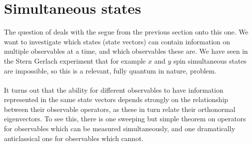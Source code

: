 \section{Simultaneous states}
The question of  deals with the segue from the previous section onto this one. We want to investigate which states (state vectors) can contain information on multiple observables at a time, and which observables these are. We have seen in the Stern Gerlach experiment that for example $x$ and $y$ spin simultaneous states are impossible, so this is a relevant, fully quantum in nature, problem.
\\\\
It turns out that the ability for different observables to have information represented in the same state vectors depends strongly on the relationship between their observable operators, as these in turn relate their orthonormal eigenvectors. To see this, there is one sweeping but simple theorem on operators for observables which can be measured simultaneously, and one dramatically anticlassical one for observables which cannot.
